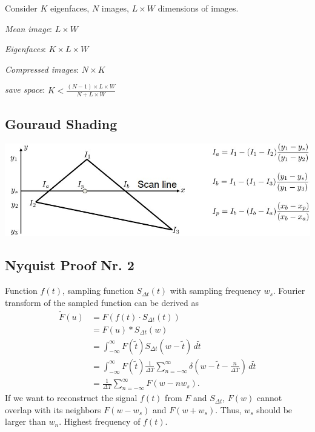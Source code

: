 \begin{definition}
  Consider \(K\) eigenfaces, \(N\) images, \(L \times W\) dimensions of images.
  \begin{itemize*}
    \item \textit{Mean image}: \(L \times W\)
    \item \textit{Eigenfaces}: \(K \times L \times W\)
    \item \textit{Compressed images}: \(N \times K\)
    \item \textit{save space}: \(K < \frac{(N - 1) \times L \times W}{N + L \times W}\)
  \end{itemize*}
\end{definition}

\subsection{Gouraud Shading}
\includegraphics*[width=\linewidth]{assets/gs.jpg}

\subsection{Nyquist Proof Nr. 2}
{Function $f(t)$, sampling function $S_{\Delta t}(t)$ with sampling frequency $w_s$}. Fourier transform of the sampled function can be derived as
\begin{align*}
    \tilde{F}(u) &= F(f(t) \cdot S_{\Delta t}(t)) \\
                 &= F(u) * S_{\Delta t}(w) \\
                 &= \int_{-\infty}^{\infty} F(\tilde{t}) S_{\Delta t}(w - \tilde{t}) \, d\tilde{t} \\
                 &= \int_{-\infty}^{\infty} F(\tilde{t}) \frac{1}{\Delta T} \sum_{n = -\infty}^{\infty} \delta (w - \tilde{t} - \frac{n}{\Delta T}) \, d\tilde{t} \\
                 &= \frac{1}{\Delta T} \sum_{n = -\infty}^{\infty} F(w - n w_s).
\end{align*}
If we want to reconstruct the signal $f(t)$ from $F$ and $S_{\Delta t}$, $F(w)$ cannot overlap with its neighbors $F(w - w_s)$ and $F(w + w_s)$. Thus, $w_s$ should be larger than $w_n$. {\color{gray}Highest frequency of $f(t)$}.

